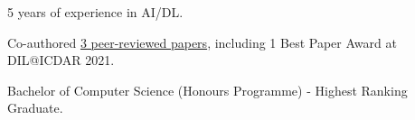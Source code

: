 % 
\begin{zitemize}
    \item 5 years of experience in AI/DL.
    \item Co-authored \href{https://scholar.google.com/citations?user=\gscholarid}{3 peer-reviewed papers}, including 1 Best Paper Award at DIL@ICDAR 2021.
    \item Bachelor of Computer Science (Honours Programme) - Highest Ranking Graduate.
\end{zitemize}
